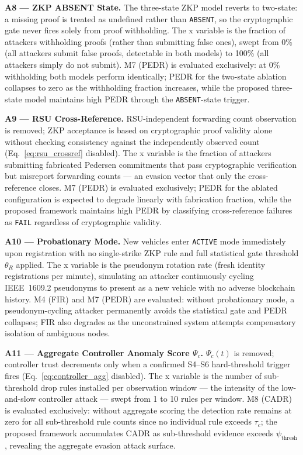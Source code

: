 \documentclass[12pt, a4paper]{report}
\newcommand{\mypar}{\vspace{0.8em}\noindent}
\begin{document}
\mypar
\textbf{A8 --- ZKP ABSENT State.}
The three-state ZKP model reverts to two-state: a missing proof is
treated as undefined rather than \texttt{ABSENT}, so the cryptographic
gate never fires solely from proof withholding. The x variable is the
fraction of attackers withholding proofs (rather than submitting false
ones), swept from 0\% (all attackers submit false proofs, detectable
in both models) to 100\% (all attackers simply do not submit). M7
(PEDR) is evaluated exclusively: at 0\% withholding both models perform
identically; PEDR for the two-state ablation collapses to zero as the
withholding fraction increases, while the proposed three-state model
maintains high PEDR through the \texttt{ABSENT}-state trigger.

\mypar
\textbf{A9 --- RSU Cross-Reference.}
RSU-independent forwarding count observation is removed; ZKP acceptance
is based on cryptographic proof validity alone without checking
consistency against the independently observed count
(Eq.~\eqref{eq:rsu_crossref} disabled). The x variable is the fraction
of attackers submitting fabricated Pedersen commitments that pass
cryptographic verification but misreport forwarding counts — an evasion
vector that only the cross-reference closes. M7 (PEDR) is evaluated
exclusively; PEDR for the ablated configuration is expected to degrade
linearly with fabrication fraction, while the proposed framework
maintains high PEDR by classifying cross-reference failures as
\texttt{FAIL} regardless of cryptographic validity.

\mypar
\textbf{A10 --- Probationary Mode.}
New vehicles enter \texttt{ACTIVE} mode immediately upon registration
with no single-strike ZKP rule and full statistical gate threshold
$\theta_R$ applied. The x variable is the pseudonym rotation rate
(fresh identity registrations per minute), simulating an attacker
continuously cycling IEEE~1609.2 pseudonyms to present as a new vehicle
with no adverse blockchain history. M4 (FIR) and M7 (PEDR) are
evaluated: without probationary mode, a pseudonym-cycling attacker
permanently avoids the statistical gate and PEDR collapses; FIR also
degrades as the unconstrained system attempts compensatory isolation of
ambiguous nodes.

\mypar
\textbf{A11 --- Aggregate Controller Anomaly Score $\Psi_c$.}
$\Psi_c(t)$ is removed; controller trust decrements only when a
confirmed S4--S6 hard-threshold trigger fires
(Eq.~\eqref{eq:controller_agg} disabled). The x variable is the number
of sub-threshold drop rules installed per observation window — the
intensity of the low-and-slow controller attack — swept from 1 to 10
rules per window. M8 (CADR) is evaluated exclusively: without aggregate
scoring the detection rate remains at zero for all sub-threshold rule
counts since no individual rule exceeds $\tau_c$; the proposed
framework accumulates CADR as sub-threshold evidence exceeds
$\psi_{\text{thresh}}$, revealing the aggregate evasion attack surface.
\end{document}
